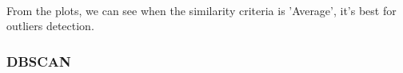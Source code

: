 \documentclass[11pt]{article}
\begin{document}
    \begin{center}
    \end{center}
    { \hspace*{\fill} \\}
    
    \begin{center}
    \end{center}
    { \hspace*{\fill} \\}
    
    \begin{center}
    \end{center}
    { \hspace*{\fill} \\}
    
    From the plots, we can see when the similarity criteria is 'Average',
it's best for outliers detection.

    \subsubsection{DBSCAN}\label{dbscan}
\end{document}

